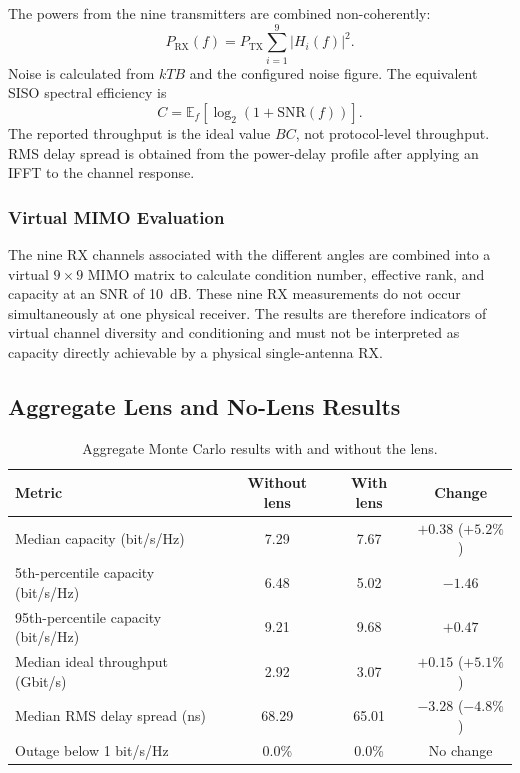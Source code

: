 \documentclass[10pt]{article}
\begin{document}
The powers from the nine transmitters are combined non-coherently:
\begin{equation}
    P_{\mathrm{RX}}(f)
    =P_{\mathrm{TX}}\sum_{i=1}^{9}\left|H_i(f)\right|^2.
    \label{eq:monte_carlo_rx_power}
\end{equation}
Noise is calculated from $kTB$ and the configured noise figure. The
equivalent SISO spectral efficiency is
\begin{equation}
    C=\mathbb{E}_{f}\!\left[\log_2\left(1+\mathrm{SNR}(f)\right)\right].
    \label{eq:monte_carlo_siso_capacity}
\end{equation}
The reported throughput is the ideal value $B C$, not protocol-level
throughput. RMS delay spread is obtained from the power-delay profile after
applying an IFFT to the channel response.

\subsubsection{Virtual MIMO Evaluation}

The nine RX channels associated with the different angles are combined into
a virtual $9\times9$ MIMO matrix to calculate condition number, effective
rank, and capacity at an SNR of 10~dB. These nine RX measurements do not occur
simultaneously at one physical receiver. The results are therefore indicators
of virtual channel diversity and conditioning and must not be interpreted as
capacity directly achievable by a physical single-antenna RX.

\subsection{Aggregate Lens and No-Lens Results}

\begin{table}[H]
    \centering
    \caption{Aggregate Monte Carlo results with and without the lens.}
    \label{tab:monte_carlo_aggregate}
    \small
    \begin{tabular}{lccc}
        \hline
        \textbf{Metric} & \textbf{Without lens} & \textbf{With lens} &
        \textbf{Change} \\
        \hline
        Median capacity (bit/s/Hz) & 7.29 & 7.67 & $+0.38$ ($+5.2\%$) \\
        5th-percentile capacity (bit/s/Hz) & 6.48 & 5.02 & $-1.46$ \\
        95th-percentile capacity (bit/s/Hz) & 9.21 & 9.68 & $+0.47$ \\
        Median ideal throughput (Gbit/s) & 2.92 & 3.07 & $+0.15$ ($+5.1\%$) \\
        Median RMS delay spread (ns) & 68.29 & 65.01 & $-3.28$ ($-4.8\%$) \\
        Outage below 1 bit/s/Hz & 0.0\% & 0.0\% & No change \\
        \hline
    \end{tabular}
\end{table}
\end{document}
